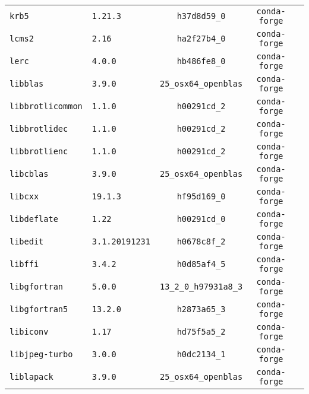 \begin{longtable}{p{}|l|ccc}
\texttt{krb5}             & \texttt{1.21.3}      & \texttt{h37d8d59\_0}     & \texttt{conda-forge}\\
\texttt{lcms2}            & \texttt{2.16}        & \texttt{ha2f27b4\_0}     & \texttt{conda-forge}\\
\texttt{lerc}                     & \texttt{4.0.0}              & \texttt{hb486fe8\_0}       & \texttt{conda-forge}\\
\texttt{libblas}                  & \texttt{3.9.0}              & \texttt{25\_osx64\_openblas} & \texttt{conda-forge}\\
\texttt{libbrotlicommon}          & \texttt{1.1.0}              & \texttt{h00291cd\_2}       & \texttt{conda-forge}\\
\texttt{libbrotlidec}             & \texttt{1.1.0}              & \texttt{h00291cd\_2}       & \texttt{conda-forge}\\
\texttt{libbrotlienc}             & \texttt{1.1.0}              & \texttt{h00291cd\_2}       & \texttt{conda-forge}\\
\texttt{libcblas}                 & \texttt{3.9.0}              & \texttt{25\_osx64\_openblas} & \texttt{conda-forge}\\
\texttt{libcxx}                   & \texttt{19.1.3}             & \texttt{hf95d169\_0}       & \texttt{conda-forge}\\
\texttt{libdeflate}               & \texttt{1.22}               & \texttt{h00291cd\_0}       & \texttt{conda-forge}\\
\texttt{libedit}                  & \texttt{3.1.20191231}       & \texttt{h0678c8f\_2}       & \texttt{conda-forge}\\
\texttt{libffi}                   & \texttt{3.4.2}              & \texttt{h0d85af4\_5}       & \texttt{conda-forge}\\
\texttt{libgfortran}              & \texttt{5.0.0}              & \texttt{13\_2\_0\_h97931a8\_3} & \texttt{conda-forge}\\
\texttt{libgfortran5}             & \texttt{13.2.0}             & \texttt{h2873a65\_3}       & \texttt{conda-forge}\\
\texttt{libiconv}                 & \texttt{1.17}               & \texttt{hd75f5a5\_2}       & \texttt{conda-forge}\\
\texttt{libjpeg-turbo}            & \texttt{3.0.0}              & \texttt{h0dc2134\_1}       & \texttt{conda-forge}\\
\texttt{liblapack}                & \texttt{3.9.0}              & \texttt{25\_osx64\_openblas} & \texttt{conda-forge}\\

\end{longtable}
